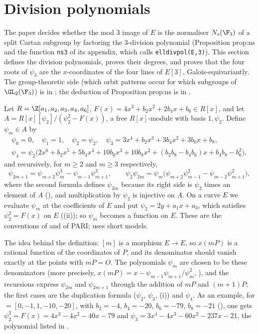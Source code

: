\section{Division polynomials}\label{sec:ellcurves:divpol}

The paper decides whether the mod $3$ image of $E$ is the normaliser $N_s(\F_3)$ of a split Cartan subgroup by factoring the $3$-division polynomial
(Proposition prop:ns and the function \texttt{ns3} of its appendix, which calls \texttt{elldivpol(E,3)}). This section defines the division polynomials,
proves their degrees, and proves that the four roots of $\psi_3$ are the $x$-coordinates of the four lines of $E[3]$, Galois-equivariantly. The group-theoretic
side (which orbit patterns occur for which subgroups of $\GL_2(\F_3)$) is in ; the deduction of Proposition prop:ns is in
.

\begin{definition}\label{def:ellcurves:divpol}
Let $R=\Z[a_1,a_2,a_3,a_4,a_6]$, $F(x)=4x^3+b_2x^2+2b_4x+b_6\in R[x]$, and let $A=R[x][\psi_2]/(\psi_2^2-F(x))$, a free $R[x]$-module with basis $1,\psi_2$. Define
$\psi_m\in A$ by
\begin{gather*}
\psi_0=0,\quad\psi_1=1,\quad\psi_2=\psi_2,\quad\psi_3=3x^4+b_2x^3+3b_4x^2+3b_6x+b_8,\\
\psi_4=\psi_2\bigl(2x^6+b_2x^5+5b_4x^4+10b_6x^3+10b_8x^2+(b_2b_8-b_4b_6)x+b_4b_8-b_6^2\bigr),
\end{gather*}
and recursively, for $m\ge2$ and $m\ge3$ respectively,
\[
\psi_{2m+1}=\psi_{m+2}\psi_m^3-\psi_{m-1}\psi_{m+1}^3,\qquad\psi_2\psi_{2m}=\psi_m\bigl(\psi_{m+2}\psi_{m-1}^2-\psi_{m-2}\psi_{m+1}^2\bigr),
\]
where the second formula defines $\psi_{2m}$ because its right side is $\psi_2$ times an element of $A$ (), and
multiplication by $\psi_2$ is injective on $A$. On a curve $E$ we evaluate $\psi_m$ at the coefficients of $E$ and put $\psi_2=2y+a_1x+a_3$, which satisfies
$\psi_2^2=F(x)$ on $E$ ((ii)); so $\psi_m$ becomes a function on $E$. These are the conventions of \cite[Exercise 3.7]{SilvermanAEC}
and of PARI; \cite[Section 3.2]{WashingtonEC} uses short models.
\end{definition}

The idea behind the definition: $[m]$ is a morphism $E\to E$, so $x(mP)$ is a rational function of the coordinates of $P$, and its denominator should vanish
exactly at the points with $mP=O$. The polynomials $\psi_m$ are chosen to be these denominators (more precisely, $x(mP)=x-\psi_{m-1}\psi_{m+1}/\psi_m^2$,
), and the recursions express $\psi_{2m}$ and $\psi_{2m+1}$ through the addition of $mP$ and $(m+1)P$; the first cases are the
duplication formula ($\psi_2$, $\psi_3$, (i)) and $\psi_4$. As an example, for  $=[0,-1,1,-10,-20]$, with $b_2=-4$, $b_4=-20$,
$b_6=-79$, $b_8=-21$ (), one gets $\psi_2^2=F(x)=4x^3-4x^2-40x-79$ and $\psi_3=3x^4-4x^3-60x^2-237x-21$, the polynomial
listed in .

